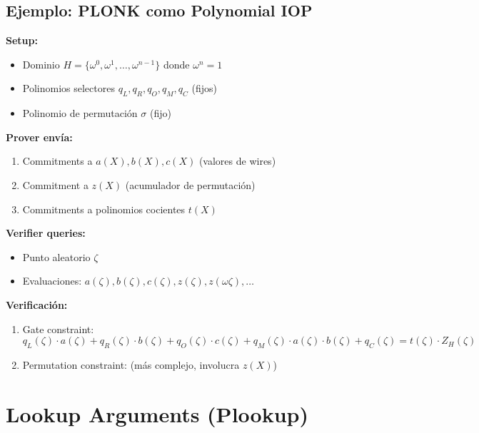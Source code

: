 \documentclass[11pt,a4paper,twoside]{book}
\begin{document}
\subsection{Ejemplo: PLONK como Polynomial IOP}

\begin{example}
\textbf{Setup:}
\begin{itemize}
    \item Dominio $H = \{\omega^0, \omega^1, \ldots, \omega^{n-1}\}$ donde $\omega^n = 1$
    \item Polinomios selectores $q_L, q_R, q_O, q_M, q_C$ (fijos)
    \item Polinomio de permutaci\'on $\sigma$ (fijo)
\end{itemize}

\textbf{Prover env\'ia:}
\begin{enumerate}
    \item Commitments a $a(X), b(X), c(X)$ (valores de wires)
    \item Commitment a $z(X)$ (acumulador de permutaci\'on)
    \item Commitments a polinomios cocientes $t(X)$
\end{enumerate}

\textbf{Verifier queries:}
\begin{itemize}
    \item Punto aleatorio $\zeta$
    \item Evaluaciones: $a(\zeta), b(\zeta), c(\zeta), z(\zeta), z(\omega\zeta), \ldots$
\end{itemize}

\textbf{Verificaci\'on:}
\begin{enumerate}
    \item Gate constraint:
    \[ q_L(\zeta) \cdot a(\zeta) + q_R(\zeta) \cdot b(\zeta) + q_O(\zeta) \cdot c(\zeta) + q_M(\zeta) \cdot a(\zeta) \cdot b(\zeta) + q_C(\zeta) = t(\zeta) \cdot Z_H(\zeta) \]
    
    \item Permutation constraint: (m\'as complejo, involucra $z(X)$)
\end{enumerate}
\end{example}

\section{Lookup Arguments (Plookup)}
\end{document}
